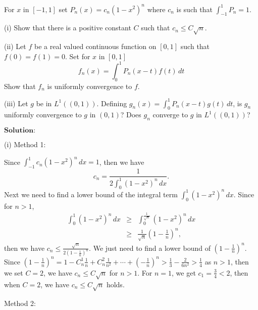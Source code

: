 \documentclass[12pt,a4paper]{ctexart}
\begin{document}
For $x$ in $[-1, 1]$ set $P_{n} (x) = c_{n} (1 - x^{2})^{n}$ where $c_{n}$ is such that $\int_{-1}^{1} P_{n} = 1.$

(i) Show that there is a positive constant $C$ such that $c_{n} \leq C \sqrt{n}$.

(ii) Let $f$ be a real valued continuous function on $[0, 1]$ such that $f(0) = f(1) = 0$. Set for $x$ in $[0, 1]$
\begin{equation*}
    f_{n}(x) = \int_{0}^{1} P_{n}(x-t) f(t) \, d t
\end{equation*}
Show that $f_{n}$ is uniformly convergence to $f$.

(iii) Let $g$ be in $L^{1}((0, 1))$. Defining $g_{n}(x) = \int_{0}^{1} P_{n} (x- t) g(t) \, d t$, is $g_{n}$ uniformly convergence to $g$ in $(0, 1)$? Does $g_{n}$ converge to $g$ in $L^{1}((0, 1))$?

\vspace{8pt}
$\textbf{Solution:}$

(i) Method 1:

Since $\int_{-1}^{1} c_{n} (1-x^{2})^{n}\, d x = 1$, then we have
\begin{equation*}
   c_{n} = \frac{1}{2 \int_{0}^{1}(1-x^{2})^{n} \, d x }.
\end{equation*}
Next we need to find a lower bound of the integral term $\int_{0}^{1}(1-x^{2})^{n} \, d x$. Since for $n > 1$,
\begin{eqnarray*}
\int_{0}^{1}(1-x^{2})^{n} \, d x &\geq& \int_{0}^{\frac{1}{\sqrt{n}}}(1-x^{2})^{n} \, d x  \\
            &\geq& \frac{1}{\sqrt{n}} (1 - \frac{1}{n})^{n},
\end{eqnarray*}
then we have $c_{n} \leq \frac{\sqrt{n}}{2 (1-\frac{1}{n})^{n}}$. We just need to find a lower bound of $(1 - \frac{1}{n})^{n}$. Since $(1 - \frac{1}{n})^{n} = 1 - C_{n}^{1} \frac{1}{n} + C_{n}^{2} \frac{1}{n^{2}} + \cdots + (-\frac{1}{n})^{n} > \frac{1}{3} - \frac{2}{6n^{2}}  > \frac{1}{4}$ as $n > 1$, then we set $C = 2$, we have $c_{n} \leq C \sqrt{n}$ for $n>1$. For $n = 1$, we get $c_{1} = \frac{3}{4} < 2$, then when $C = 2$, we have $c_{n} \leq C \sqrt{n}$ holds.

Method 2:
\end{document}
